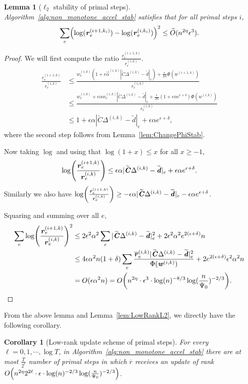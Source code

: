 \documentclass[11pt]{article}
\newtheorem{lemma}[theorem]{Lemma}
\newtheorem{corollary}[theorem]{Corollary}
\let\originalleft\left
\let\originalright\right
\renewcommand{\left}{\mathopen{}\mathclose\bgroup\originalleft}
\renewcommand{\right}{\aftergroup\egroup\originalright}
\newcommand\dd{\boldsymbol{\mathit{d}}}
\newcommand\rr{\boldsymbol{\mathit{r}}}
\newcommand\ww{\boldsymbol{\mathit{w}}}
\newcommand\rrbar{\overline{\boldsymbol{\mathit{r}}}}
\newcommand\CC{\boldsymbol{\mathit{C}}}
\newcommand\Otil{\widetilde{O}}
\newcommand{\wt}{\widetilde}
\newcommand{\ov}{\overline}
\begin{document}
\begin{lemma}[$\ell_2$ stability of primal steps]
Algorithm~\ref{alg:non_monotone_accel_stab} satisfies that for all primal steps $i$,
\[
\sum_e \left(\log(\rr_e^{(i+1,k_i)})-\log (\rr_e^{(i,k_i)})\right)^2 \leq \Otil(n^{2\eta}\epsilon^{3}).
\]
\end{lemma}
\begin{proof}
We will first compute the ratio $\frac{\rr_e^{(i+1,k)}}{\rr_e^{(i,k)}}$.
    \begin{align*}
   \frac{\rr_e^{(i+1,k)}}{\rr_e^{(i,k)}} &\leq \frac{\ww_e^{(i,k)}(1+\epsilon \overrightarrow{\alpha}^{(i,k)} |\wt{\CC}\Delta^{(i,k)}-\wt{\dd}|_e)+ \frac{\epsilon}{2n}\Phi(\ww^{(i+1,k)})}{\rr_e^{(i,k)}}\\
    & \leq \frac{\ww_e^{(i,k)} + \epsilon \alpha\ww^{(i,k)}_e|\wt{\CC}\Delta^{(i,k)}-\wt{\dd}|_e +\frac{\epsilon}{2n}(1+\epsilon\alpha e^{\epsilon + \delta})\Phi(\ww^{(i,k)})}{\rr^{(i,k)}_e}\\
    & \leq 1 + \epsilon \alpha |\wt{\CC}\Delta^{(i,k)}-\wt{\dd}|_e + \epsilon\alpha e^{\epsilon + \delta},
    \end{align*}
where the second step follows from Lemma~\ref{lem:ChangePhiStab}.
    
    Now taking $\log$ and using that $\log(1+x) \leq x$ for all $x\geq -1$,
    \[
     \log \left(\frac{\rr_e^{(i+1,k)}}{\rr_e^{(i,k)}}\right) \leq \epsilon \alpha |\wt{\CC}\Delta^{(i,k)}-\wt{\dd}|_e + \epsilon\alpha e^{\epsilon + \delta}.
    \]
    Similarly we also have $\log \left(\frac{\rr_e^{(i+1,k)}}{\rr_e^{(i,k)}}\right) \geq -\epsilon \alpha |\wt{\CC}\Delta^{(i,k)}-\wt{\dd}|_e - \epsilon\alpha e^{\epsilon + \delta}$.
    
    Squaring and summing over all $e$,
    \begin{align*}
    \sum_e \log \left(\frac{\rr_e^{(i+1,k)}}{\rr_e^{(i,k)}}\right)^2 & \leq 2\epsilon^2 \alpha^2 \sum_e |\wt{\CC}\Delta^{(i,k)}-\wt{\dd}|^2_e + 2 \epsilon^2 \alpha^2 e^{2(\epsilon + \delta)} n\\
    &\leq 4\epsilon \alpha^2 n (1+\delta) \sum_e \frac{\rrbar^{(i,k)}_e |\wt{\CC}\Delta^{(i,k)}-\wt{\dd}|^2_e}{\Phi(\ww^{(i,k)})} + 2 e^{2(\epsilon + \delta)}\epsilon^2 \alpha^2 n\\
    & = O(\epsilon\alpha^2 n) = O\left(n^{2\eta} \cdot \epsilon^3 \cdot \log(n)^{-8/3} \log(\frac{n}{\Psi_0})^{-2/3}\right). \end{align*}
\end{proof}

From the above lemma and Lemma~\ref{lem:LowRankL2}, we directly have the following corollary.
\begin{corollary}[Low-rank update scheme of primal steps]
For every $\ell = 0,1, \cdots, \log T$, in Algorithm~\ref{alg:non_monotone_accel_stab} there are at most $\frac{T}{2^{\ell}}$ number of primal steps in which $\ov{\rr}$ receives an update of rank $O\left(n^{2\eta} 2^{2\ell}\cdot \epsilon \cdot \log(n)^{-2/3} \log(\frac{n}{\Psi_0})^{-2/3} \right)$. 
\end{corollary}
\end{document}
